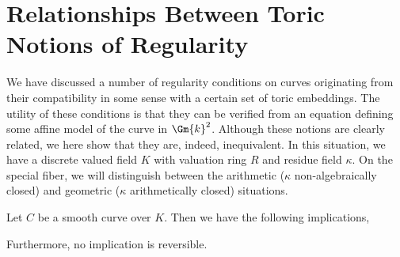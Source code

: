 \section{Relationships Between Toric Notions of Regularity}

We have discussed a number of regularity conditions on curves originating from their compatibility in some sense with a certain set of toric embeddings. The utility of these conditions is that they can be verified from an equation defining some affine model of the curve in $\Gm{k}^2$. Although these notions are clearly related, we here show that they are, indeed, inequivalent. In this situation, we have a discrete valued field $K$ with valuation ring $R$ and residue field $\kappa$. On the special fiber, we will distinguish between the arithmetic ($\kappa$ non-algebraically closed) and geometric ($\kappa$ arithmetically closed) situations. 

\begin{prop}
Let $C$ be a smooth curve over $K$. Then we have the following implications,
\begin{center}
\end{center}
Furthermore, no implication is reversible. 
\end{prop}

